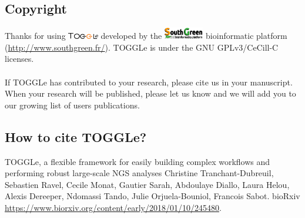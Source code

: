 \subsection{Copyright}

Thanks for using  \includegraphics[width=0.1\textwidth]{../img/toggleLogo2.png}  developed by the \includegraphics[width=0.13\textwidth]{../img/SGLogo.png} bioinformatic platform \cite{SouthGreen2016} (\url{http://www.southgreen.fr/}). TOGGLe is under the GNU GPLv3/CeCill-C licenses.
\\
\\
If TOGGLe has contributed to your research, please cite us in your manuscript. When your research will be published, please let us know and we will add you to our growing list of users publications.

\subsection{How to cite TOGGLe?}
TOGGLe, a flexible framework for easily building complex workflows and performing robust large-scale NGS analyses
Christine Tranchant-Dubreuil, Sebastien Ravel, Cecile Monat, Gautier Sarah, Abdoulaye Diallo, Laura Helou, Alexis Dereeper, Ndomassi Tando, Julie Orjuela-Bouniol, Francois Sabot. bioRxiv \url{https://www.biorxiv.org/content/early/2018/01/10/245480}.
